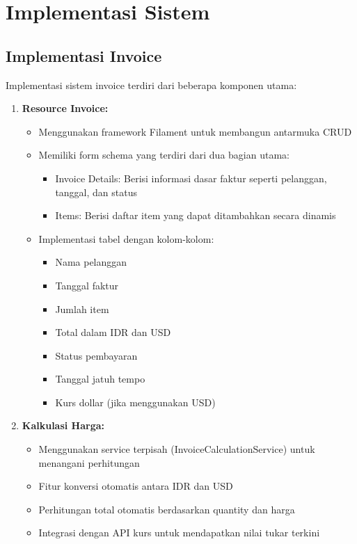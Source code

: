 \documentclass[a4paper]{report}
\begin{document}
\section{Implementasi Sistem}
\subsection{Implementasi Invoice}
Implementasi sistem invoice terdiri dari beberapa komponen utama:

\begin{enumerate}
\item \textbf{Resource Invoice:}
    \begin{itemize}
    \item Menggunakan framework Filament untuk membangun antarmuka CRUD
    \item Memiliki form schema yang terdiri dari dua bagian utama:
        \begin{itemize}
        \item Invoice Details: Berisi informasi dasar faktur seperti pelanggan, tanggal, dan status
        \item Items: Berisi daftar item yang dapat ditambahkan secara dinamis
        \end{itemize}
    \item Implementasi tabel dengan kolom-kolom:
        \begin{itemize}
        \item Nama pelanggan
        \item Tanggal faktur
        \item Jumlah item
        \item Total dalam IDR dan USD
        \item Status pembayaran
        \item Tanggal jatuh tempo
        \item Kurs dollar (jika menggunakan USD)
        \end{itemize}
    \end{itemize}

\item \textbf{Kalkulasi Harga:}
    \begin{itemize}
    \item Menggunakan service terpisah (InvoiceCalculationService) untuk menangani perhitungan
    \item Fitur konversi otomatis antara IDR dan USD
    \item Perhitungan total otomatis berdasarkan quantity dan harga
    \item Integrasi dengan API kurs untuk mendapatkan nilai tukar terkini
    \end{itemize}


\end{enumerate}
\end{document}
